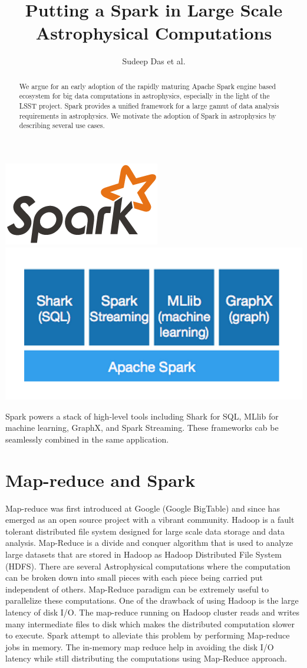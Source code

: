 \documentclass{tufte-handout}
\title{Putting  a Spark in Large Scale Astrophysical Computations}
\author{Sudeep Das et al.}
\begin{document}
\maketitle
\begin{marginfigure}
\includegraphics[width=0.4\linewidth]{spark-logo}
\includegraphics[width=\linewidth]{spark.png}
\caption{Spark powers a stack of high-level tools including Shark for SQL, MLlib for machine learning, GraphX, and Spark Streaming. These frameworks  cab be seamlessly combined in the same application.}
\end{marginfigure}

\begin{abstract}
We  argue for an early adoption of the rapidly maturing  Apache Spark engine based ecosystem for  big data computations in astrophysics, especially in the light of the LSST project.  Spark provides a unified framework for a large gamut of data analysis requirements in astrophysics. We motivate the adoption of Spark in astrophysics by describing several use cases. 
\end{abstract}
\section{Map-reduce and Spark}
Map-reduce was first introduced at Google (Google BigTable) and since has emerged as an open source project with a vibrant community. Hadoop is a fault tolerant distributed file system designed for large scale data storage and data analysis. Map-Reduce is a divide and conquer algorithm that is used to analyze large datasets that are stored in Hadoop as Hadoop Distributed File System (HDFS). There are several Astrophysical computations where the computation can be broken down into small pieces with each piece being carried put independent of others. Map-Reduce paradigm can be extremely useful to parallelize these computations. One of the drawback of using Hadoop is the large latency of disk I/O. The map-reduce running on Hadoop cluster reads and writes many intermediate files to disk which makes the distributed computation slower to execute. Spark attempt to alleviate this problem by performing Map-reduce jobs in memory.  The  in-memory map reduce help in avoiding the disk I/O latency while still distributing the computations using Map-Reduce approach.
\end{document}
